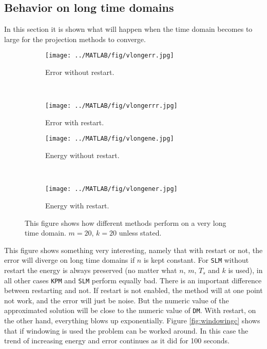\subsection{Behavior on long time domains} %
In this section it is shown what will happen when the time domain becomes to large for the projection methods to converge.
\label{sec:longtime}
\begin{figure}[H]
        \centering
        \begin{subfigure}[b]{0.3\textwidth}
                \texttt{[image: ../MATLAB/fig/vlongerr.jpg]}
                \caption{ Error without restart. }
                \label{fig:vlongerr}
        \end{subfigure}
		~
        \begin{subfigure}[b]{0.3\textwidth}
                \texttt{[image: ../MATLAB/fig/vlongerrr.jpg]}
                \caption{ Error with restart. }
                \label{fig:vlongerrr}
        \end{subfigure}
        
		\begin{subfigure}[b]{0.3\textwidth}
                \texttt{[image: ../MATLAB/fig/vlongene.jpg]}
                \caption{ Energy without restart. }
                \label{fig:vlongene}
        \end{subfigure}
		~
		\begin{subfigure}[b]{0.3\textwidth}
                \texttt{[image: ../MATLAB/fig/vlongener.jpg]}
                \caption{ Energy with restart. }
                \label{fig:vlongener}
        \end{subfigure}
        \caption{ This figure shows how different methods perform on a very long time domain.  $m = 20$, $k = 20$ unless stated. }
        \label{fig:vlong}
\end{figure}
\noindent This figure shows something very interesting, namely that with restart or not, the error will diverge on long time domains if $n$ is kept constant. For \texttt{SLM} without restart the energy is always preserved (no matter what $n$, $m$, $T_s$ and $k$ is used), in all other cases \texttt{KPM} and \texttt{SLM} perform equally bad. There is an important difference between restarting and not. If restart is not enabled, the method will at one point not work, and the error will just be noise. But the numeric value of the approximated solution will be close to the numeric value of \texttt{DM}. With restart, on the other hand, everything blows up exponentially. Figure \ref{fig:windowingc} shows that if windowing is used the problem can be worked around. In this case the trend of increasing energy and error continues as it did for 100 seconds. \\

